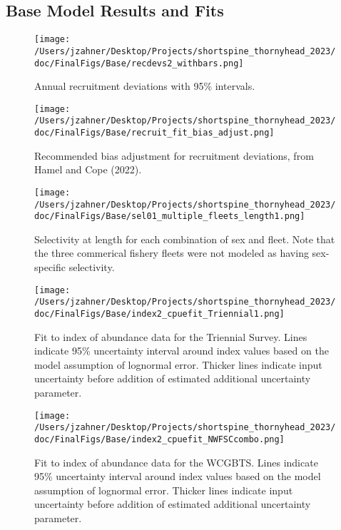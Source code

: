 \documentclass[11pt,
  english,
  letterpaper,
]{article}
\begin{document}
\hypertarget{base-model-results-and-fits}{%
\subsection{Base Model Results and Fits}\label{base-model-results-and-fits}}

\begin{figure}
\centering
\texttt{[image: /Users/jzahner/Desktop/Projects/shortspine\_thornyhead\_2023/doc/FinalFigs/Base/recdevs2\_withbars.png]}
\caption{Annual recruitment deviations with 95\% intervals.\label{fig:recdevs}}
\end{figure}

\begin{figure}
\centering
\texttt{[image: /Users/jzahner/Desktop/Projects/shortspine\_thornyhead\_2023/doc/FinalFigs/Base/recruit\_fit\_bias\_adjust.png]}
\caption{Recommended bias adjustment for recruitment deviations, from Hamel and Cope (2022).\label{fig:recdevs_bias_adjust}}
\end{figure}

\begin{figure}
\centering
\texttt{[image: /Users/jzahner/Desktop/Projects/shortspine\_thornyhead\_2023/doc/FinalFigs/Base/sel01\_multiple\_fleets\_length1.png]}
\caption{Selectivity at length for each combination of sex and fleet. Note that the three commerical fishery fleets were not modeled as having sex-specific selectivity.\label{fig:selcurvs}}
\end{figure}

\begin{figure}
\centering
\texttt{[image: /Users/jzahner/Desktop/Projects/shortspine\_thornyhead\_2023/doc/FinalFigs/Base/index2\_cpuefit\_Triennial1.png]}
\caption{Fit to index of abundance data for the Triennial Survey. Lines indicate 95\% uncertainty interval around index values based on the model assumption of lognormal error. Thicker lines indicate input uncertainty before addition of estimated additional uncertainty parameter.\label{fig:fitsTri1}}
\end{figure}

\begin{figure}
\centering
\texttt{[image: /Users/jzahner/Desktop/Projects/shortspine\_thornyhead\_2023/doc/FinalFigs/Base/index2\_cpuefit\_NWFSCcombo.png]}
\caption{Fit to index of abundance data for the WCGBTS. Lines indicate 95\% uncertainty interval around index values based on the model assumption of lognormal error. Thicker lines indicate input uncertainty before addition of estimated additional uncertainty parameter.\label{fig:fitscombo}}
\end{figure}
\end{document}
